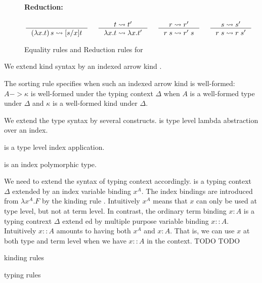 \begin{figure}
\paragraph{Reduction:}
$  \inference{}{(\lambda x.t)\,s \rightsquigarrow [s/x]t}
 ~~~~
   \inference{t \rightsquigarrow t'}{\lambda x.t \rightsquigarrow \lambda x.t'}
 ~~~~
   \inference{r \rightsquigarrow r'}{r\;s \rightsquigarrow r'\;s}
 ~~~~
   \inference{s \rightsquigarrow s'}{r\;s \rightsquigarrow r\;s'} $

\caption{Equality rules and Reduction rules for \Fi}
\label{fig:eqFi}
\end{figure}


We extend kind syntax by an indexed arrow kind .

The sorting rule 
specifies when such an indexed arrow kind is well-formed:
$A -> \kappa$ is well-formed under the typing context $\Delta$
when $A$ is a well-formed type under $\Delta$
and $\kappa$ is a well-formed kind under $\Delta$.

We extend the type syntax by several constructs.
 is type level lambda abstraction over an index.

 is a type level index application.

 is an index polymorphic type.

We need to extend the syntax of typing context accordingly.
 is a typing context $\Delta$ extended by
an index variable binding $x^A$. The index bindings are introduced from
$\lambda x^A.F$ by the kinding rule .
Intuitively $x^A$ means that $x$ can only be used at type level,
but not at term level. In contrast, the ordinary term binding $x:A$
 is a typing contrext $\Delta$ extend ed by
multiple purpose variable binding $x::A$. Intuitively $x::A$ amounts to
having both $x^A$ and $x:A$. That is, we can use $x$ at both type and
term level when we have $x::A$ in the context.
TODO
TODO

kinding rules

typing rules
\newFi{(::)}










